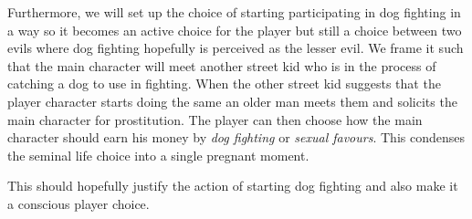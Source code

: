 Furthermore, we will set up the choice of starting participating in dog fighting in a way so it becomes an active choice for the player but still a choice between two evils where dog fighting hopefully is perceived as the lesser evil. We frame it such that the main character will meet another street kid who is in the process of catching a dog to use in fighting. When the other street kid suggests that the player character starts doing the same an older man meets them and solicits the main character for prostitution. The player can then choose how the main character should earn his money by \textit{dog fighting} or \textit{sexual favours}. This condenses the seminal life choice into a single pregnant moment.\

This should hopefully justify the action of starting dog fighting and also make it a conscious player choice.\
